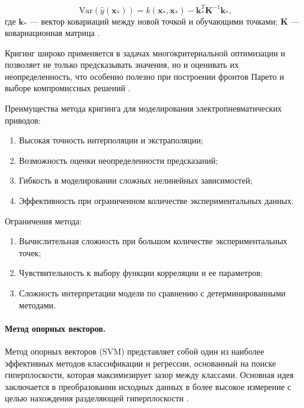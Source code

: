 \begin{equation*}
    \text{Var}(\hat{y}(\mathbf{x}_*)) = k(\mathbf{x}_*, \mathbf{x}_*) - \mathbf{k}_*^T \mathbf{K}^{-1} \mathbf{k}_*,
\end{equation*}
где $\mathbf{k}_*$ — вектор ковариаций между новой точкой и обучающими точками;
$\mathbf{K}$ — ковариационная матрица \cite{zhou2020enhanced}.

Кригинг широко применяется в задачах многокритериальной оптимизации и позволяет
не только предсказывать значения, но и оценивать их неопределенность, что особенно
полезно при построении фронтов Парето и выборе компромиссных решений \cite{radaideh2020surrogate}.

Преимущества метода кригинга для моделирования электропневматических приводов:

\begin{enumerate}
    \item Высокая точность интерполяции и экстраполяции;
    \item Возможность оценки неопределенности предсказаний;
    \item Гибкость в моделировании сложных нелинейных зависимостей;
    \item Эффективность при ограниченном количестве экспериментальных данных.
\end{enumerate}

Ограничения метода:

\begin{enumerate}
    \item Вычислительная сложность при большом количестве экспериментальных точек;
    \item Чувствительность к выбору функции корреляции и ее параметров;
    \item Сложность интерпретации модели по сравнению с детерминированными методами.
\end{enumerate}

\paragraph{Метод опорных векторов.}

Метод опорных векторов (SVM) представляет собой один из наиболее эффективных методов классификации и
регрессии, основанный на поиске гиперплоскости, которая максимизирует зазор между классами.
Основная идея заключается в преобразовании исходных данных в более
высокое измерение с целью нахождения разделяющей гиперплоскости \cite{Jakkula2006}.

